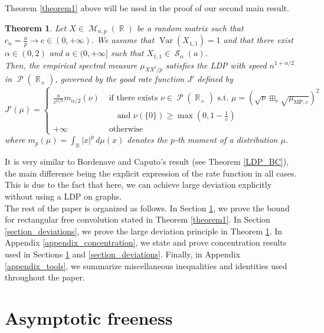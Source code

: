 \documentclass[11pt,a4paper]{article}
\DeclareMathOperator{\R}{\mathbb{R}}
\DeclareMathOperator{\MM}{\mathcal{M}}
\DeclareMathOperator{\PP}{\mathcal{P}}
\DeclareMathOperator{\Sz}{\mathcal{S}}
\DeclareMathOperator{\1}{\mathbf{1}}
\DeclareMathOperator{\Var}{\mathrm{Var}}
\newcommand{\mump}{\mu_{\mathrm{MP},c}}
\newtheorem{Theorem}[Proposition]{Theorem}
\theoremstyle{definition}
\begin{document}
Theorem \ref{theorem1} above will be used in the proof of our second main result.

\begin{Theorem} \label{theorem2}
Let $X \in \MM_{n,p}(\R)$ be a random matrix such that $c_n = \frac{n}{p} \to c \in (0,+\infty)$. We assume that $\Var(X_{1,1})=1$ and that there exist $\alpha \in (0,2)$ and $a \in (0,+\infty]$ such that $X_{1,1} \in \Sz_{\alpha}(a)$.\\
Then, the empirical spectral measure $\mu_{XX^t/p}$ satisfies the LDP with speed $n^{1+\alpha/2}$ in $\PP(\R_+)$, governed by the good rate function $J'$ defined by
\begin{displaymath}
J'(\mu) = \left\{ \begin{array}{ll}
\frac{a}{c^{\alpha/2}} m_{\alpha/2}(\nu) & \textrm{ if there exists } \nu \in \PP(\R_+) \textrm{ s.t. } \mu = \left( \sqrt{\nu} \boxplus_c \sqrt{\mump} \right)^2 \\
& \quad \textrm{ and } \nu(\{0\}) \ge \max \left( 0,1-\frac1c \right) \\
+\infty & \textrm{ otherwise}
\end{array} \right.
\end{displaymath}
where $m_p(\mu) = \int_{\R} |x|^p \, d\mu(x)$ denotes the $p$-th moment of a distribution $\mu$.
\end{Theorem}

It is very similar to Bordenave and Caputo's result (see Theorem \ref{LDP_BC}), the main difference being the explicit expression of the rate function in all cases. This is due to the fact that here, we can achieve large deviation explicitly without using a LDP on graphs.\\

The rest of the paper is organized as follows. In Section \ref{section_freeness}, we prove the bound for rectangular free convolution stated in Theorem \ref{theorem1}. In Section \ref{section_deviations}, we prove the large deviation principle in Theorem \ref{theorem2}. In Appendix \ref{appendix_concentration}, we state and prove concentration results used in Sections \ref{section_freeness} and \ref{section_deviations}. Finally, in Appendix \ref{appendix_tools}, we summarize miscellaneous inequalities and identities used throughout the paper.




\section{Asymptotic freeness} \label{section_freeness}
\end{document}
